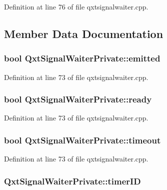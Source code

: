 Definition at line 76 of file qxtsignalwaiter.\-cpp.



\subsection{Member Data Documentation}
\hypertarget{class_qxt_signal_waiter_private_a7f384d0f03b1d7a0bac2f72b196c048b}{
\subsubsection[{emitted}]{\setlength{\rightskip}{0pt plus 5cm}bool Qxt\-Signal\-Waiter\-Private\-::emitted}}\label{class_qxt_signal_waiter_private_a7f384d0f03b1d7a0bac2f72b196c048b}


Definition at line 73 of file qxtsignalwaiter.\-cpp.

\hypertarget{class_qxt_signal_waiter_private_aa5920d5f36ba9c6cc6f3f39c5fe47aef}{
\subsubsection[{ready}]{\setlength{\rightskip}{0pt plus 5cm}bool Qxt\-Signal\-Waiter\-Private\-::ready}}\label{class_qxt_signal_waiter_private_aa5920d5f36ba9c6cc6f3f39c5fe47aef}


Definition at line 73 of file qxtsignalwaiter.\-cpp.

\hypertarget{class_qxt_signal_waiter_private_a775a9d0690085d3b91ed242e6d6f5241}{
\subsubsection[{timeout}]{\setlength{\rightskip}{0pt plus 5cm}bool Qxt\-Signal\-Waiter\-Private\-::timeout}}\label{class_qxt_signal_waiter_private_a775a9d0690085d3b91ed242e6d6f5241}


Definition at line 73 of file qxtsignalwaiter.\-cpp.

\hypertarget{class_qxt_signal_waiter_private_aa0788f635008ab144f4200abf918bdb1}{
\subsubsection[{timer\-I\-D}]{ Qxt\-Signal\-Waiter\-Private\-::timer\-I\-D}}\label{class_qxt_signal_waiter_private_aa0788f635008ab144f4200abf918bdb1}


